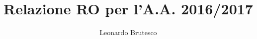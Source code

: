 \documentclass[11pt]{article}
\title{Relazione RO per l'A.A. 2016/2017}
\author{Leonardo Brutesco}
\begin{document}












\iffalse
	\section{Risultati del problema}
	\newpage

	\section{Osservazioni}
	\newpage
\fi
	
	\appendix


	\newpage
\end{document}

